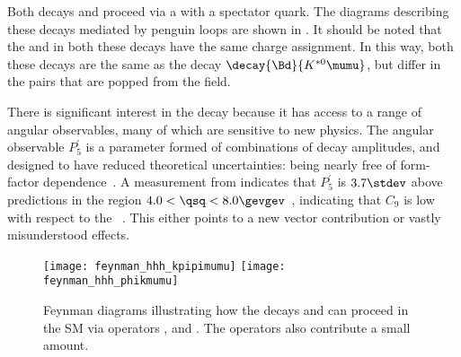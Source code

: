 
Both decays \btokpipimumu and \btophikmumu proceed via a \decay{\bquark}{\squark\mumu} \fcnc with a
spectator \uquark quark.
The diagrams describing these decays mediated by penguin loops are shown in
.
It should be noted that the \Bp and \Kp in both these decays have the same charge assignment.
In this way, both these decays are the same as the \fcnc decay $\decay{\Bd}{K^{*0}\mumu}$, but
differ in the \qqbar pairs that are popped from the \QCD field.

There is significant interest in the decay \btokstrmumu because it has access to a range of angular
observables, many of which are sensitive to new physics.
The angular observable $P_5^\prime$ is a parameter formed of combinations of \Kstarz decay
amplitudes, and designed to have reduced theoretical uncertainties: being nearly free of form-factor
dependence~\cite{LHCb-PAPER-2013-037}.
A measurement from \lhcb indicates that $P_5^\prime$ is $3.7\stdev$ above
predictions in the region $4.0<\qsq<8.0\gevgev$~\cite{LHCb-CONF-2015-002},
indicating that $C_9$ is low with respect to the \sm~\cite{Altmannshofer:2014rta}.
This either points to a new vector contribution or vastly misunderstood \QCD effects.



\begin{figure}
  \begin{center}
    \texttt{[image: feynman\_hhh\_kpipimumu]}
    \texttt{[image: feynman\_hhh\_phikmumu]}
    \caption[Feynman diagrams for \btokpipimumu and \btophikmumu]
    {
      Feynman diagrams illustrating how the decays \btokpipimumu and \btophikmumu can proceed in
      the SM via operators ,  and .
      The operators  also contribute a small amount.
    }
    \label{fig:hhh:feyn}
  \end{center}
\end{figure}

